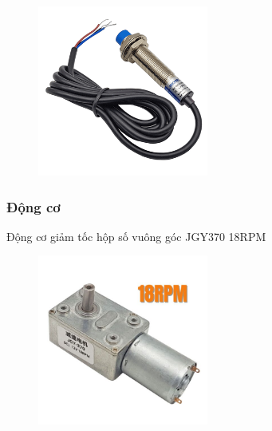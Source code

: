 \begin{figure}[H]
    \centering
    \includegraphics[width=0.5\textwidth]{pictures/Sensor.png}
\end{figure}
\cleardoublepage



\subsubsection{Động cơ}
Động cơ giảm tốc hộp số vuông góc JGY370 18RPM
\begin{figure}[H]
    \centering
    \includegraphics[width=0.5\textwidth]{pictures/motor.png}
\end{figure}

\cleardoublepage